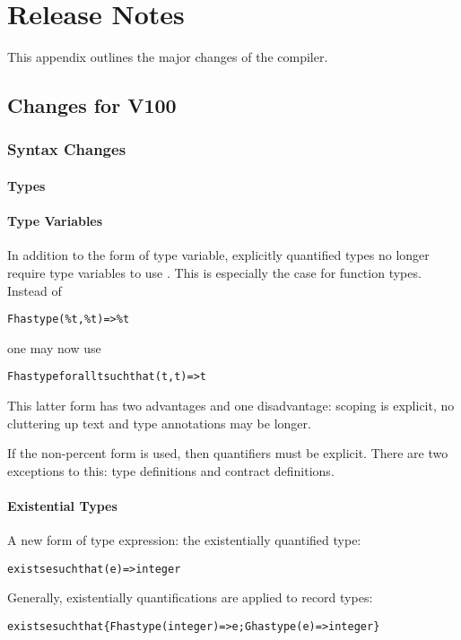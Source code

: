 \chapter{Release Notes}
\label{notes}

This appendix outlines the major changes of the \Sr compiler.

\section{Changes for V100}
\subsection{Syntax Changes}

\subsubsection{Types}

\subsubsection{Type Variables}
In addition to the  form of type variable, explicitly quantified types no longer require type variables to use \q{\%}. This is especially the case for function types. Instead of
\begin{alltt}
F has type (\%t,\%t)=>\%t
\end{alltt}
one may now use
\begin{alltt}
F has type for all t such that (t,t)=>t
\end{alltt}
This latter form has two advantages and one disadvantage: scoping is explicit, no \q{\%} cluttering up text and type annotations may be longer.

If the non-percent form is used, then quantifiers must be explicit. There are two exceptions to this: type definitions and contract definitions.

\subsubsection{Existential Types}
A new form of type expression: the existentially quantified type:
\begin{alltt}
exists e such that (e)=>integer
\end{alltt}
Generally, existentially quantifications are applied to record types:
\begin{alltt}
exists e such that \{ F has type (integer)=>e; G has type (e)=>integer \}
\end{alltt}

